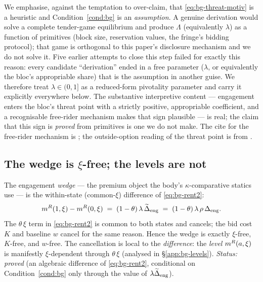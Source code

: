 \begin{remark}
\label{rem:bg-threat-honest}
We emphasise, against the temptation to over-claim, that
\eqref{eq:bg-threat-motiv} is a heuristic and Condition~\ref{cond:bg} is an
\emph{assumption}. A genuine derivation would solve a complete tender-game
equilibrium and produce $\Lambda$ (equivalently $\lambda$) as a function of
primitives (block size, reservation values, the fringe's bidding protocol); that
game is orthogonal to this paper's disclosure mechanism and we do not solve it.
Five earlier attempts to close this step failed for exactly this reason: every
candidate ``derivation'' ended in a free parameter ($\lambda$, or equivalently
the bloc's appropriable share) that is the assumption in another guise. We
therefore treat $\lambda\in(0,1]$ as a reduced-form pivotality parameter and
carry it explicitly everywhere below. The substantive interpretive content ---
engagement enters the bloc's threat point with a strictly positive, appropriable
coefficient, and a recognisable free-rider mechanism makes that sign plausible
--- is real; the claim that this sign is \emph{proved} from primitives is one we
do not make. The cite for the free-rider mechanism is \citet{GrossmanHart1980};
the outside-option reading of the threat point is from
\citet{BinmoreRubinsteinWolinsky1986}.
\end{remark}

\subsection{The wedge is \texorpdfstring{$\xi$}{xi}-free; the levels are not}
\label{app:bg-wedge}

The engagement \emph{wedge} --- the premium object the body's $\kappa$-comparative
statics use --- is the within-state ($\text{common-}\xi$) difference of
\eqref{eq:bg-rent2}:
\begin{equation}
  \label{eq:bg-wedge}
  m^{R}(1,\xi)-m^{R}(0,\xi)\;=\;(1-\theta)\,\lambda\,\widetilde{\Delta}_{\mathrm{eng}}
  \;=\;(1-\theta)\,\lambda\,\rho\,\Delta_{\mathrm{eng}} .
\end{equation}
The $\theta\,\xi$ term in \eqref{eq:bg-rent2} is common to both states and
cancels; the bid cost $K$ and baseline $w$ cancel for the same reason. Hence the
wedge is exactly $\xi$-free, $K$-free, and $w$-free. The cancellation is local to
the \emph{difference}: the \emph{level} $m^{R}(a,\xi)$ is manifestly $\xi$-dependent
through $\theta\,\xi$ (analysed in \S\ref{app:bg-levels}). \emph{Status: proved}
(an algebraic difference of \eqref{eq:bg-rent2}, conditional on
Condition~\ref{cond:bg} only through the value of $\lambda\widetilde{\Delta}_{\mathrm{eng}}$).

